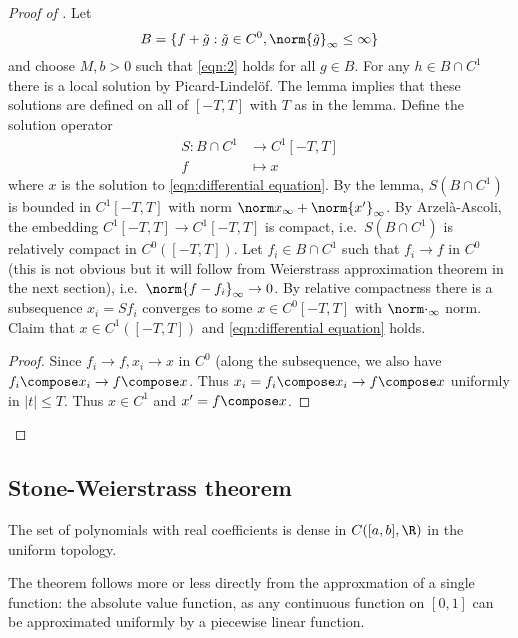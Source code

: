 \documentclass[a4paper]{article}
\begin{document}
\begin{proof}[Proof of ]
  Let
  \[
    B = \{f + \tilde g: \tilde g \in C^0, \norm{\tilde g}_\infty \leq \infty\}
  \]
  and choose \(M, b > 0\) such that \eqref{eqn:2} holds for all \(g \in B\). For any \(h \in B \cap C^1\) there is a local solution by Picard-Lindelöf. The lemma implies that these solutions are defined on all of \([-T, T]\) with \(T\) as in the lemma. Define the solution operator
  \begin{align*}
    S: B \cap C^1 &\to C^1[-T, T] \\
    f &\mapsto x
  \end{align*}
  where \(x\) is the solution to \eqref{eqn:differential equation}. By the lemma, \(S(B \cap C^1)\) is bounded in \(C^1[-T, T]\) with norm \(\norm x_\infty + \norm{x'}_\infty\). By Arzelà-Ascoli, the embedding \(C^1[-T, T] \to C^1[-T, T]\) is compact, i.e.\ \(S(B \cap C^1)\) is relatively compact in \(C^0([-T, T])\). Let \(f_i \in B \cap C^1\) such that \(f_i \to f\) in \(C^0\) (this is not obvious but it will follow from Weierstrass approximation theorem in the next section), i.e.\ \(\norm{f - f_i}_\infty \to 0\). By relative compactness there is a subsequence \(x_i = Sf_i\) converges to some \(x \in C^0[-T, T]\) with \(\norm \cdot_\infty\) norm. Claim that \(x \in C^1([-T, T])\) and \eqref{eqn:differential equation} holds.

  \begin{proof}
    Since \(f_i \to f,  x_i \to x\) in \(C^0\) (along the subsequence, we also have \(f_i \compose x_i \to f \compose x\). Thus \(x_i = f_i \compose x_i \to f \compose x\) uniformly in \(|t| \leq T\). Thus \(x \in C^1\) and \(x' = f \compose x\).
  \end{proof}
\end{proof}

\subsection{Stone-Weierstrass theorem}

\begin{theorem}
  \label{thm:Weierstrass approximation theorem}
  The set of polynomials with real coefficients is dense in \(C([a, b], \R)\) in the uniform topology.
\end{theorem}

The theorem follows more or less directly from the approxmation of a single function: the absolute value function, as any continuous function on \([0, 1]\) can be approximated uniformly by a piecewise linear function.
\end{document}
